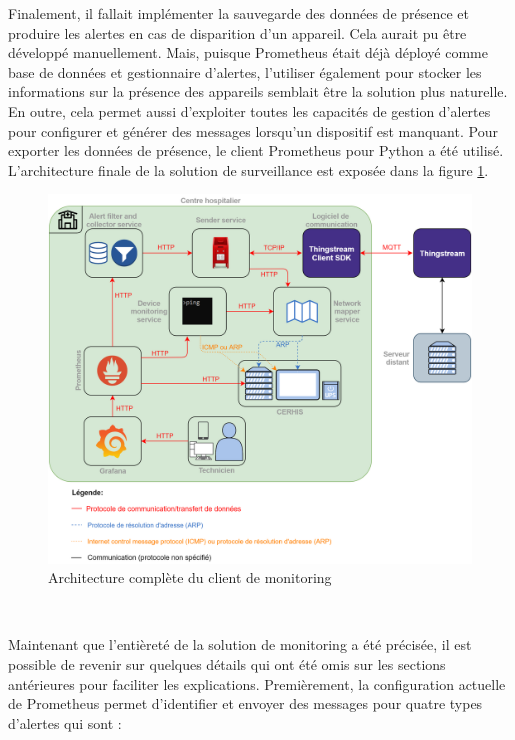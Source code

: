 \noindent
Finalement, il fallait implémenter la sauvegarde des données de présence et produire les alertes en cas de disparition d’un appareil. Cela aurait pu être développé manuellement. Mais, puisque Prometheus était déjà déployé comme base de données et gestionnaire d’alertes, l’utiliser également pour stocker les informations sur la présence des appareils semblait être la solution plus naturelle. En outre, cela permet aussi d’exploiter toutes les capacités de gestion d’alertes pour configurer et générer des messages lorsqu’un dispositif est manquant. Pour exporter les données de présence, le client Prometheus pour Python a été utilisé. L'architecture finale de la solution de surveillance est exposée dans la figure \ref{fig:arch_final}.


\begin{figure}[ht!]
  \centering
  \includegraphics[width=\textwidth]{img/app/arch_complete.png}
  \caption{Architecture complète du client de monitoring}
  \label{fig:arch_final}
\end{figure}


~

\newpage

\noindent
Maintenant que l’entièreté de la solution de monitoring a été précisée, il est possible de revenir sur quelques détails qui ont été omis sur les sections antérieures pour faciliter les explications. Premièrement, la configuration actuelle de Prometheus permet d’identifier et envoyer des messages pour quatre types d’alertes qui sont :

